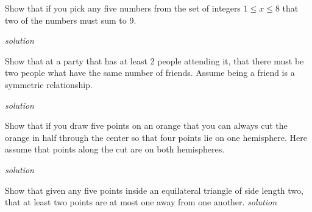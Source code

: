 \documentclass{amsbook}
\begin{document}
\begin{Answer}[ref={php3}]
    
\end{Answer}

\begin{Exercise}[title={Partitions of a Number}, difficulty=1, label=php4]
    Show that if you pick any five numbers from the set of integers $1\leq x \leq 8$ that two of the numbers must sum to 9.

    \hfill \emph{solution} 
\end{Exercise}

\begin{Answer}[ref={php4}]
    
\end{Answer}

\begin{Exercise}[title={A Friendly Party}, difficulty=2, label=php5]
    Show that at a party that has at least 2 people attending it, that there must be two people what have the same number of friends. Assume being a friend is a symmetric relationship. 

    \hfill \emph{solution} 
\end{Exercise}

\begin{Answer}[ref={php5}]
    
\end{Answer}

\begin{Exercise}[title={Orange Great Circles}, difficulty=2, label =php6]
    Show that if you draw five points on an orange that you can always cut the orange in half through the center so that four points lie on one hemisphere. Here assume that points along the cut are on both hemispheres.

    \hfill \emph{solution} 
\end{Exercise}

\begin{Answer}[ref={php6}]
    
\end{Answer}

\begin{Exercise}[title={Finding Points}, difficulty=3, label=php1]
    Show that given any five points inside an equilateral triangle of side length two, that at least two points are at most one away from one another. 
    \hfill \emph{solution} 
\end{Exercise}
\end{document}
